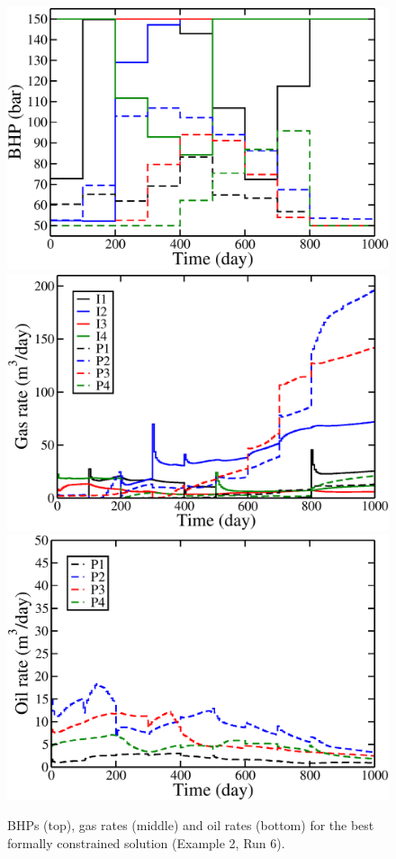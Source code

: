 \begin{figure}
\begin{center}
\includegraphics[totalheight=2.2in,angle=0]{figures/spe10TopLayerConstrainedOptimalIuPa_BHP.pdf}
\includegraphics[totalheight=2.2in,angle=0]{figures/spe10TopLayerConstrainedOptimalIuPa_rate_gas.pdf}
\includegraphics[totalheight=2.2in,angle=0]{figures/spe10TopLayerConstrainedOptimalIuPa_rate_oil.pdf}
\end{center}
\caption{BHPs (top), gas rates (middle) and oil rates
  (bottom) for the best formally constrained solution (Example 2, Run 6).}
\label{fig:SPE10TopLayerConstrainedOptimalRates}
\end{figure}



